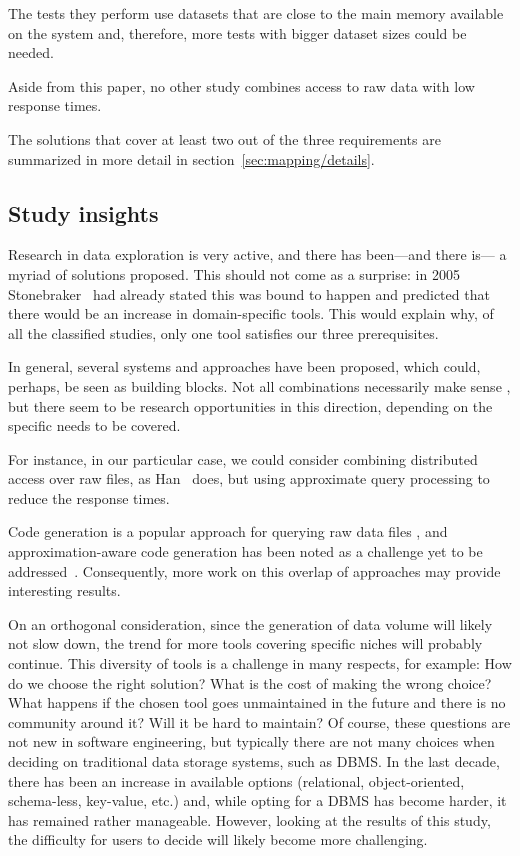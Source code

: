 The tests they perform use datasets that are close
to the main memory available on the system and, therefore, more tests with bigger 
dataset sizes could be needed.

Aside from this paper, no other study combines access to raw data with low
response times.

The solutions that cover at least two out of the three requirements are 
summarized in more detail in section~\ref{sec:mapping/details}.

\subsection{Study insights}
\label{sec:mapping/insights}
Research in data exploration is very active, and there has been---and there is---
a myriad of solutions proposed. This should not come as a surprise:
in 2005 Stonebraker~\cite{Stonebraker2005} had already stated this was bound to
happen and predicted that there would be an increase in domain-specific tools.
This would explain why, of all the classified studies, only one tool satisfies our
three prerequisites.

In general, several systems and approaches have been proposed, which could,
perhaps, be seen as building blocks. Not all combinations necessarily make sense
, but there seem to be research opportunities in this direction, depending
on the specific needs to be covered.

For instance, in our particular case, we could consider combining distributed
access over raw files, as Han~\cite{Han2017} does, but using approximate query
processing to reduce the response times.

Code generation is a popular approach for querying raw data files
, and approximation-aware code generation has been noted as a challenge
yet to be addressed~\cite{Mozafari2017AQP}. Consequently, more work on this
overlap of approaches may provide interesting results.

On an orthogonal consideration, since the generation of data volume will likely
not slow down, the trend for more tools covering specific
niches will probably continue. This diversity of tools is a
challenge in many respects, for example: How do we choose the right solution? What is
the cost of making the wrong choice? What happens if the chosen tool goes
unmaintained in the future and there is no community around it? Will it
be hard to maintain? Of course, these questions are not new in software
engineering, but typically there are not many choices when deciding
on traditional data storage systems, such as \gls{DBMS}.
In the last decade, there has been an increase in available options
(relational, object-oriented, schema-less, key-value, etc.) and, while opting
for a \gls{DBMS} has become harder, it has remained rather manageable. However, looking at the
results of this study, the difficulty for users to decide will likely become
more challenging.


